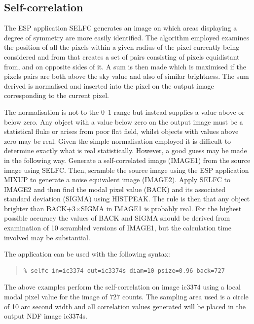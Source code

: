 \documentclass[twoside,11pt]{article}
\newenvironment{myquote}{\begin{quote}\begin{small}}{\end{small}\end{quote}}
\begin{document}
\subsection{Self-correlation}

The ESP application SELFC generates an image on which areas
displaying a degree of symmetry are more easily identified. The algorithm
employed examines the position of all the pixels within a given radius of
the pixel currently being considered and from that creates a set of pairs
consisting of pixels equidistant from, and on opposite sides of it. A
sum is then made which is maximised if the pixels pairs are both above
the sky value and also of similar brightness. The sum derived is
normalised and inserted into the pixel on the output image corresponding
to the current pixel.

The normalisation is not to the 0--1 range but instead supplies a value above
or below zero. Any object with a value below zero on the output image
must be a statistical fluke or arises from poor flat field, whilst
objects with values above zero may be real. Given the simple normalisation
employed it is difficult to determine exactly what is real statistically.
However, a good guess may be made in the following way. Generate a
self-correlated image (IMAGE1) from the source image using SELFC. Then,
scramble the source image using the ESP application MIXUP to generate
a noise equivalent image (IMAGE2). Apply SELFC to IMAGE2 and then find
the modal pixel value (BACK) and its associated standard deviation (SIGMA) using
HISTPEAK. The rule is then that any object brighter than BACK$+$3$\times$SIGMA
in IMAGE1 is probably real. For the highest possible accuracy the values
of BACK and SIGMA should be derived from examination of 10 scrambled versions
of IMAGE1, but the calculation time involved may be substantial.

The application can be used with the following syntax:

\begin{myquote}
\begin{verbatim}
% selfc in=ic3374 out=ic3374s diam=10 psize=0.96 back=727
\end{verbatim}
\end{myquote}

The above examples perform the self-correlation on image ic3374 using a local
modal pixel value for the image of 727 counts. The sampling area used is
a circle of 10 arc second width and all correlation values generated
will be placed in the output NDF image ic3374s.
\end{document}
